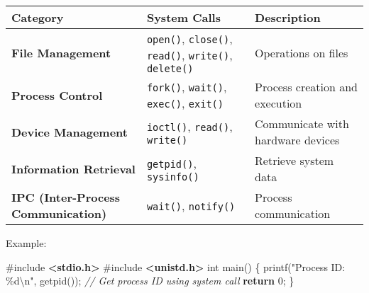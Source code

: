 \documentclass[
]{article}
\newenvironment{Shaded}{}{}
\newcommand{\CommentTok}[1]{\textcolor[rgb]{0.38,0.63,0.69}{\textit{#1}}}
\newcommand{\ControlFlowTok}[1]{\textcolor[rgb]{0.00,0.44,0.13}{\textbf{#1}}}
\newcommand{\DataTypeTok}[1]{\textcolor[rgb]{0.56,0.13,0.00}{#1}}
\newcommand{\DecValTok}[1]{\textcolor[rgb]{0.25,0.63,0.44}{#1}}
\newcommand{\ImportTok}[1]{\textcolor[rgb]{0.00,0.50,0.00}{\textbf{#1}}}
\newcommand{\NormalTok}[1]{#1}
\newcommand{\OperatorTok}[1]{\textcolor[rgb]{0.40,0.40,0.40}{#1}}
\newcommand{\PreprocessorTok}[1]{\textcolor[rgb]{0.74,0.48,0.00}{#1}}
\newcommand{\SpecialCharTok}[1]{\textcolor[rgb]{0.25,0.44,0.63}{#1}}
\newcommand{\StringTok}[1]{\textcolor[rgb]{0.25,0.44,0.63}{#1}}
\begin{document}
\begin{longtable}[]{@{}
  >{\raggedright\arraybackslash}p{}
  >{\raggedright\arraybackslash}p{}
  >{\raggedright\arraybackslash}p{}@{}}
\toprule\noalign{}
\begin{minipage}[b]{\linewidth}\raggedright
\textbf{Category}
\end{minipage} & \begin{minipage}[b]{\linewidth}\raggedright
\textbf{System Calls}
\end{minipage} & \begin{minipage}[b]{\linewidth}\raggedright
\textbf{Description}
\end{minipage} \\
\midrule\noalign{}
\endhead
\bottomrule\noalign{}
\endlastfoot
\textbf{File Management} & \texttt{open()}, \texttt{close()},
\texttt{read()}, \texttt{write()}, \texttt{delete()} & Operations on
files \\
\textbf{Process Control} & \texttt{fork()}, \texttt{wait()},
\texttt{exec()}, \texttt{exit()} & Process creation and execution \\
\textbf{Device Management} & \texttt{ioctl()}, \texttt{read()},
\texttt{write()} & Communicate with hardware devices \\
\textbf{Information Retrieval} & \texttt{getpid()}, \texttt{sysinfo()} &
Retrieve system data \\
\textbf{IPC (Inter-Process Communication)} & \texttt{wait()},
\texttt{notify()} & Process communication \\
\end{longtable}

Example:

\begin{Shaded}
\begin{Highlighting}[]
\PreprocessorTok{\#include }\ImportTok{\textless{}stdio.h\textgreater{}}
\PreprocessorTok{\#include }\ImportTok{\textless{}unistd.h\textgreater{}}
\DataTypeTok{int}\NormalTok{ main}\OperatorTok{()} \OperatorTok{\{}
\NormalTok{    printf}\OperatorTok{(}\StringTok{"Process ID: }\SpecialCharTok{\%d\textbackslash{}n}\StringTok{"}\OperatorTok{,}\NormalTok{ getpid}\OperatorTok{());}  \CommentTok{// Get process ID using system call}
    \ControlFlowTok{return} \DecValTok{0}\OperatorTok{;}
\OperatorTok{\}}
\end{Highlighting}
\end{Shaded}
\end{document}
